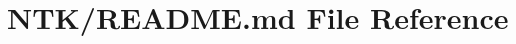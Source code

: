 \hypertarget{_r_e_a_d_m_e_8md}{}\section{N\+T\+K/\+R\+E\+A\+D\+ME.md File Reference}
\label{_r_e_a_d_m_e_8md}
